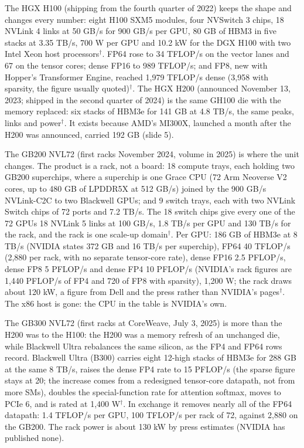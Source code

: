 \documentclass[11pt,letterpaper]{article}
\begin{document}
The HGX H100 (shipping from the fourth quarter of 2022) keeps the shape and changes every number: eight H100 SXM5 modules, four NVSwitch 3 chips, 18 NVLink 4 links at 50 GB/s for 900 GB/s per GPU, 80 GB of HBM3 in five stacks at 3.35 TB/s, 700 W per GPU and 10.2 kW for the DGX H100 with two Intel Xeon host processors$^\dagger$. FP64 rose to 34 TFLOP/s on the vector lanes and 67 on the tensor cores; dense FP16 to 989 TFLOP/s; and FP8, new with Hopper's Transformer Engine, reached 1{,}979 TFLOP/s dense (3{,}958 with sparsity, the figure usually quoted)$^\dagger$. The HGX H200 (announced November 13, 2023; shipped in the second quarter of 2024) is the same GH100 die with the memory replaced: six stacks of HBM3e for 141 GB at 4.8 TB/s, the same peaks, links and power$^\dagger$. It exists because AMD's MI300X, launched a month after the H200 was announced, carried 192 GB (slide 5).

The GB200 NVL72 (first racks November 2024, volume in 2025) is where the unit changes. The product is a rack, not a board: 18 compute trays, each holding two GB200 superchips, where a superchip is one Grace CPU (72 Arm Neoverse V2 cores, up to 480 GB of LPDDR5X at 512 GB/s) joined by the 900 GB/s NVLink-C2C to two Blackwell GPUs; and 9 switch trays, each with two NVLink Switch chips of 72 ports and 7.2 TB/s. The 18 switch chips give every one of the 72 GPUs 18 NVLink 5 links at 100 GB/s, 1.8 TB/s per GPU and 130 TB/s for the rack, and the rack is one scale-up domain$^\dagger$. Per GPU: 186 GB of HBM3e at 8 TB/s (NVIDIA states 372 GB and 16 TB/s per superchip), FP64 40 TFLOP/s (2{,}880 per rack, with no separate tensor-core rate), dense FP16 2.5 PFLOP/s, dense FP8 5 PFLOP/s and dense FP4 10 PFLOP/s (NVIDIA's rack figures are 1{,}440 PFLOP/s of FP4 and 720 of FP8 with sparsity), 1{,}200 W; the rack draws about 120 kW, a figure from Dell and the press rather than NVIDIA's pages$^\dagger$. The x86 host is gone: the CPU in the table is NVIDIA's own.

The GB300 NVL72 (first racks at CoreWeave, July 3, 2025) is more than the H200 was to the H100: the H200 was a memory refresh of an unchanged die, while Blackwell Ultra rebalances the same silicon, as the FP4 and FP64 rows record. Blackwell Ultra (B300) carries eight 12-high stacks of HBM3e for 288 GB at the same 8 TB/s, raises the dense FP4 rate to 15 PFLOP/s (the sparse figure stays at 20; the increase comes from a redesigned tensor-core datapath, not from more SMs), doubles the special-function rate for attention softmax, moves to PCIe 6, and is rated at 1{,}400 W$^\dagger$. In exchange it removes nearly all of the FP64 datapath: 1.4 TFLOP/s per GPU, 100 TFLOP/s per rack of 72, against 2{,}880 on the GB200. The rack power is about 130 kW by press estimates (NVIDIA has published none).
\end{document}
